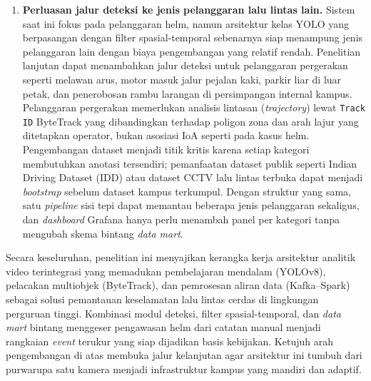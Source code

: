 \begin{enumerate}[1.]
  \item \textbf{Perluasan jalur deteksi ke jenis pelanggaran lalu lintas lain.}
    Sistem saat ini fokus pada pelanggaran helm, namun arsitektur kelas YOLO yang berpasangan dengan filter spasial-temporal sebenarnya siap menampung jenis pelanggaran lain dengan biaya pengembangan yang relatif rendah. Penelitian lanjutan dapat menambahkan jalur deteksi untuk pelanggaran pergerakan seperti melawan arus, motor masuk jalur pejalan kaki, parkir liar di luar petak, dan penerobosan rambu larangan di persimpangan internal kampus. Pelanggaran pergerakan memerlukan analisis lintasan (\textit{trajectory}) lewat \texttt{Track ID} ByteTrack yang dibandingkan terhadap poligon zona dan arah lajur yang ditetapkan operator, bukan asosiasi IoA seperti pada kasus helm. Pengembangan dataset menjadi titik kritis karena setiap kategori membutuhkan anotasi tersendiri; pemanfaatan dataset publik seperti Indian Driving Dataset (IDD) atau dataset CCTV lalu lintas terbuka dapat menjadi \textit{bootstrap} sebelum dataset kampus terkumpul. Dengan struktur yang sama, satu \textit{pipeline} sisi tepi dapat memantau beberapa jenis pelanggaran sekaligus, dan \textit{dashboard} Grafana hanya perlu menambah panel per kategori tanpa mengubah skema bintang \textit{data mart}.
\end{enumerate}

Secara keseluruhan, penelitian ini menyajikan kerangka kerja arsitektur analitik video terintegrasi yang memadukan pembelajaran mendalam (YOLOv8), pelacakan multiobjek (ByteTrack), dan pemrosesan aliran data (Kafka--Spark) sebagai solusi pemantauan keselamatan lalu lintas cerdas di lingkungan perguruan tinggi. Kombinasi modul deteksi, filter spasial-temporal, dan \textit{data mart} bintang menggeser pengawasan helm dari catatan manual menjadi rangkaian \textit{event} terukur yang siap dijadikan basis kebijakan. Ketujuh arah pengembangan di atas membuka jalur kelanjutan agar arsitektur ini tumbuh dari purwarupa satu kamera menjadi infrastruktur kampus yang mandiri dan adaptif.
